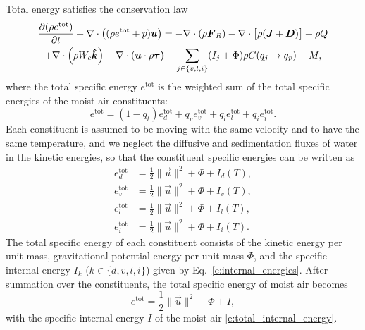 \documentclass{report}
\begin{document}
Total energy satisfies the conservation law \citep{Romps08a,Bott08a}
\begin{multline}
 \diff{(\rho e^\mathrm{tot})}{t} + \divergence \left( (\rho e^\mathrm{tot} + p)\vec{u} \right)
 = -\divergence (\rho \vec{F}_R) - \divergence \bigl[\rho (\vec{J} + \vec{D})\bigr] + \rho Q  \\
  +\divergence \left(\rho W_c \vec{\hat k} \right)  - \divergence (\vec{u} \cdot \rho\vec{\tau)} %
   - \sum_{j\in\{v,l,i\}}(I_j + \Phi)  \rho C(q_j \rightarrow q_p) - M,
 \label{e:energy_balance}
\end{multline}
where the total specific energy $e^{\mathrm{tot}}$ is the weighted sum of the total specific energies of the moist air constituents:
\begin{equation}\label{e:energy_sum}
    e^{\mathrm{tot}} = (1-q_t) e_d^{\mathrm{tot}} + q_v e_v^{\mathrm{tot}} + q_l e_l^{\mathrm{tot}} + q_i e_i^{\mathrm{tot}}.
\end{equation}
Each constituent is assumed to be moving with the same velocity and to have the same temperature, and we neglect the diffusive and sedimentation fluxes of water in the kinetic energies, so that the constituent specific energies can be written as
\begin{subequations}\label{e:constituent_energies}
\begin{align}
e_d^{\mathrm{tot}} & = \frac{1}{2} \| \vec{u} \|^2 + \Phi + I_d(T), \\
e_v^{\mathrm{tot}} & = \frac{1}{2} \| \vec{u} \|^2 + \Phi + I_v(T), \\
e_l^{\mathrm{tot}} & = \frac{1}{2} \| \vec{u} \|^2 + \Phi + I_l(T), \\
e_i^{\mathrm{tot}} & = \frac{1}{2} \| \vec{u} \|^2 + \Phi + I_i(T).
\end{align}
\end{subequations}
The total specific energy of each constituent consists of the kinetic energy per unit mass, gravitational potential energy per unit mass $\Phi$, and the specific internal energy $I_k$ ($k \in \{d, v, l, i\}$) given by Eq.~\eqref{e:internal_energies}. After summation over the constituents, the total specific energy of moist air becomes
\begin{equation}
     e^{\mathrm{tot}} = \frac{1}{2} \| \vec{u} \|^2 + \Phi + I,
     \label{e:total_energy_def}
\end{equation}
with the specific internal energy $I$ of the moist air \eqref{e:total_internal_energy}.
\end{document}
